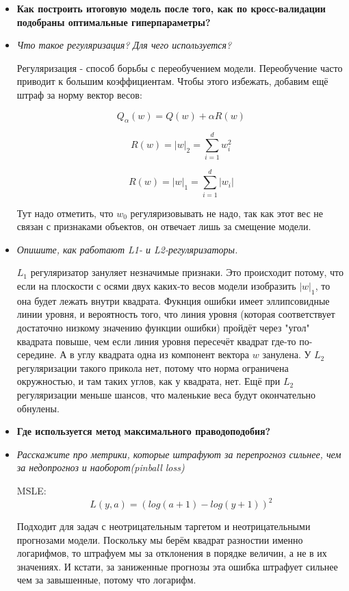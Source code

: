\documentclass[a4paper]{article}
\begin{document}
\begin{itemize}
\item \textbf{Как построить итоговую модель после того, как по кросс-валидации подобраны
оптимальные гиперпараметры?}

\item \textit{Что такое регуляризация? Для чего используется?}

Регуляризация - способ борьбы с переобучением модели. Переобучение часто приводит к большим коэффициентам. Чтобы этого избежать, добавим ещё штраф за норму вектор весов:

\[ Q_\alpha (w) = Q(w) + \alpha R(w)\]

\[ R(w) = |w|_2 = \sum_{i=1}^d w_i^2 \]

\[ R(w) = |w|_1 = \sum_{i=1}^d |w_i| \]

Тут надо отметить, что $w_0$ регуляризовывать не надо, так как этот вес не связан с признаками объектов, он отвечает лишь за смещение модели.

\item \textit{Опишите, как работают L1- и L2-регуляризаторы.}

$L_1$ регуляризатор зануляет незначимые признаки. Это происходит потому, что если на плоскости с осями двух каких-то весов модели изобразить $|w|_1$, то она будет лежать внутри квадрата. Фукнция ошибки имеет эллипсовидные линии уровня, и вероятность того, что линия уровня (которая соответствует достаточно низкому значению функции ошибки) пройдёт через "угол" квадрата повыше, чем если линия уровня пересечёт квадрат где-то по-середине. А в углу квадрата одна из компонент вектора $w$ занулена. У $L_2$ регуляризации такого прикола нет, потому что норма ограничена окружностью, и там таких углов, как у квадрата, нет.
Ещё при $L_2$ регуляризации меньше шансов, что маленькие веса будут окончательно обнулены.

\item \textbf{Где используется метод максимального праводоподобия?}

\item \textit{Расскажите про метрики, которые штрафуют за перепрогноз сильнее, чем за
недопрогноз и наоборот(pinball loss)
}

MSLE:
\[ L(y, a) = (log(a+1) - log(y+1))^2 \]

Подходит для задач с неотрицательным таргетом и неотрицательными прогнозами модели. Поскольку мы берём квадрат разностии именно логарифмов, то штрафуем мы за отклонения в порядке величин, а не в их значениях. И кстати, за заниженные прогнозы эта ошибка штрафует сильнее чем за завышенные, потому что логарифм.


\end{itemize}
\end{document}
